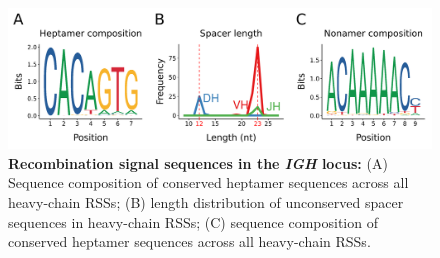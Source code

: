 	\begin{figure}
		\begin{subfigure}{0em}
        \label{fig:xma-rss-seqlogo-all-heptamer}
    \end{subfigure}
    \begin{subfigure}{0em}
        \label{fig:xma-rss-seqlogo-all-spacer}
    \end{subfigure}
    \begin{subfigure}{0em}
        \label{fig:xma-rss-seqlogo-all-nonamer}
    \end{subfigure}
	\includegraphics[width=\textwidth]{_Figures/png/xma-new-rss-seqlogo-all}
	\caption[Recombination signal sequences in the \Xma \textit{IGH} locus]{\textbf{Recombination signal sequences in the \Xma \textit{IGH} locus:} (A) Sequence composition of conserved heptamer sequences across all \Xma heavy-chain RSSs; (B) length distribution of unconserved spacer sequences in \Xma heavy-chain RSSs; (C) sequence composition of conserved heptamer sequences across all \Xma heavy-chain RSSs.}
	\label{fig:xma-rss-seqlogo-all}
	\end{figure}
	
